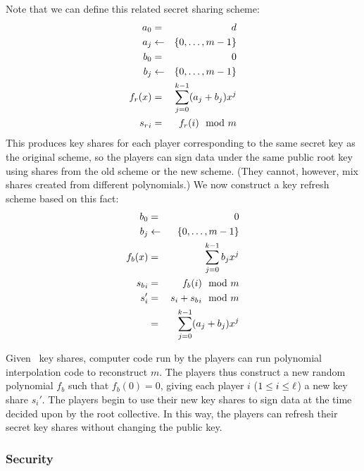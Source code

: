 Note that we can define this related secret sharing scheme:
\begin{eqnarray*}
a_0 & = & d \\
a_j & \leftarrow & \{ 0, \dots, m-1\} \\
b_0 & = & 0 \\
b_j & \leftarrow & \{ 0, \dots, m-1\} \\
f_r(x) & = & \sum_{j=0}^{k-1} (a_j+b_j)x^j \\
{s_r}_i & = & f_r(i) \mod m
\end{eqnarray*}
This produces key shares for each player corresponding to the same
secret key as the original scheme, so the players can sign data under
the same public root key using shares from the old scheme or the new
scheme. (They cannot, however, mix shares created from different
polynomials.) We now construct a key refresh scheme based on this fact:
\begin{eqnarray*}
b_0 & = & 0 \\
b_j & \leftarrow & \{ 0, \dots, m-1\} \\
f_b(x) & = & \sum_{j=0}^{k-1} b_j x^j \\
{s_b}_i & = & f_b(i) \mod m \\
s_i' & = & s_i + {s_b}_i \mod m \\
     & = & \sum_{j=0}^{k-1} (a_j+b_j)x^j
\end{eqnarray*}

Given \nums\ key shares, computer code run by the players can run
polynomial interpolation code to reconstruct $m$. The players thus construct a new random polynomial $f_b$ such that
$f_b(0)=0$, giving each player $i$ ($1\leq i \leq \ell$) a new key share 
$s_i'$. The players begin to use their new key shares to sign 
data at the time decided upon by the root collective. In this way, the
players can refresh their secret key shares without changing the
public key.



\subsubsection{Security}

